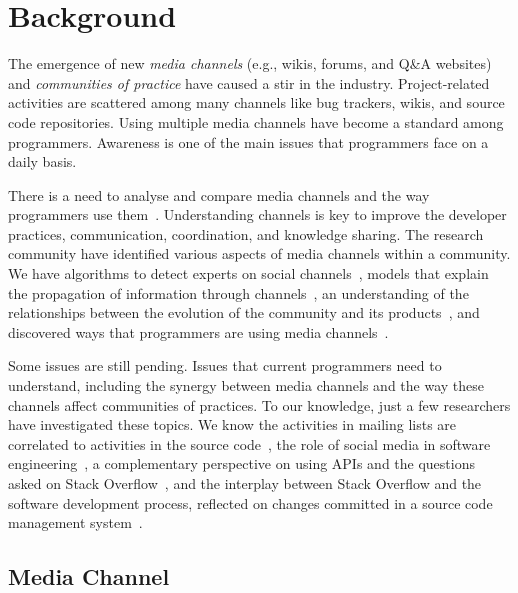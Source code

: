 \section{Background}
\label{cha:background}


    The emergence of new \textit{media channels} (e.g., wikis, forums, and Q\&A websites) and \textit{communities of practice} have caused a stir in the industry.
    Project-related activities are scattered among many channels like bug trackers, wikis, and source code repositories.
    Using multiple media channels have become a standard among programmers. 
    Awareness is one of the main issues that programmers face on a daily basis.
    
    There is a need to analyse and compare media channels and the way programmers use them~\cite{Vasilescu2014b}.
    Understanding channels is key to improve the developer practices, communication, coordination, and knowledge sharing.
    The research community have identified various aspects of media channels within a community.
    We have algorithms to detect experts on social channels~\cite{Pal2011a,Pal2012a}, models that explain the propagation of information through channels~\cite{Jin2013, Jiang2013}, an understanding of the relationships between the evolution of the community and its products~\cite{German2013}, and discovered ways that programmers are using media channels~\cite{Sowe2008a, Singh2009, Parnin2013}.

    Some issues are still pending.
    Issues that current programmers need to understand, including the synergy between media channels and the way these channels affect communities of practices.
    To our knowledge, just a few researchers have investigated these topics.
    We know the activities in mailing lists are correlated to activities in the source code~\cite{Bird2006}, the role of social media in software engineering~\cite{Storey2014, Storey2010}, a complementary perspective on using APIs and the questions asked on Stack Overflow~\cite{Kavaler2013}, and the interplay between Stack Overflow and the software development process, reflected on changes committed in a source code management system~\cite{Vasilescu2013a}.

\subsection{Media Channel}

